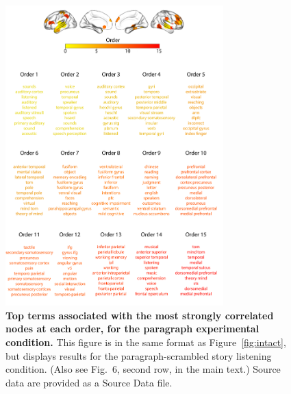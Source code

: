 \documentclass[english]{article}
\newcommand{\neurosynth}{6}
\begin{document}
\begin{figure}[p!]
\centering
\includegraphics[width=0.75\textwidth]{figs/supp_15_paragraph}
\caption{\textbf{Top terms associated with the most strongly
      correlated nodes at each order, for the paragraph experimental
    condition.}  This figure is in the same format as
  Figure~\ref{fig:intact}, but displays results for the
  paragraph-scrambled story listening condition.  (Also see Fig.~\neurosynth,
second row, in the main text.) Source data are provided as a Source Data file.}
\label{fig:paragraph}
\end{figure}
\end{document}
